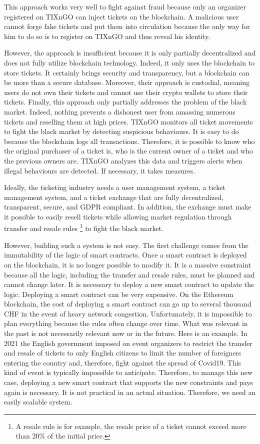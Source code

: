 \documentclass[a4paper,11pt,oneside]{report}
\begin{document}
This approach works very well to fight against fraud because only an organizer registered on TIXnGO can inject tickets on the blockchain. A malicious user cannot forge fake tickets and put them into circulation because the only way for him to do so is to register on TIXnGO and thus reveal his identity.

However, the approach is insufficient because it is only partially decentralized and does not fully utilize blockchain technology. Indeed, it only uses the blockchain to store tickets. It certainly brings security and transparency, but a blockchain can be more than a secure database. Moreover, their approach is custodial, meaning users do not own their tickets and cannot use their crypto wallets to store their tickets. Finally, this approach only partially addresses the problem of the black market. Indeed, nothing prevents a dishonest user from amassing numerous tickets and reselling them at high prices. TIXnGO monitors all ticket movements to fight the black market by detecting suspicious behaviours. It is easy to do because the blockchain logs all transactions. Therefore, it is possible to know who the original purchaser of a ticket is, who is the current owner of a ticket and who the previous owners are. TIXnGO analyzes this data and triggers alerts when illegal behaviours are detected. If necessary, it takes measures.

Ideally, the ticketing industry needs a user management system, a ticket management system, and a ticket exchange that are fully decentralized, transparent, secure, and GDPR compliant. In addition, the exchange must make it possible to easily resell tickets while allowing market regulation through transfer and resale rules \footnote{A resale rule is for example, the resale price of a ticket cannot exceed more than 20\% of the initial price.} to fight the black market.

However, building such a system is not easy. The first challenge comes from the immutability of the logic of smart contracts. Once a smart contract is deployed on the blockchain, it is no longer possible to modify it. It is a massive constraint because all the logic, including the transfer and resale rules, must be planned and cannot change later. It is necessary to deploy a new smart contract to update the logic. Deploying a smart contract can be very expensive. On the Ethereum blockchain, the cost of deploying a smart contract can go up to several thousand CHF in the event of heavy network congestion. Unfortunately, it is impossible to plan everything because the rules often change over time. What was relevant in the past is not necessarily relevant now or in the future. Here is an example. In 2021 the English government imposed on event organizers to restrict the transfer and resale of tickets to only English citizens to limit the number of foreigners entering the country and, therefore, fight against the spread of Covid19. This kind of event is typically impossible to anticipate. Therefore, to manage this new case, deploying a new smart contract that supports the new constraints and pays again is necessary. It is not practical in an actual situation. Therefore, we need an easily scalable system.
\end{document}
